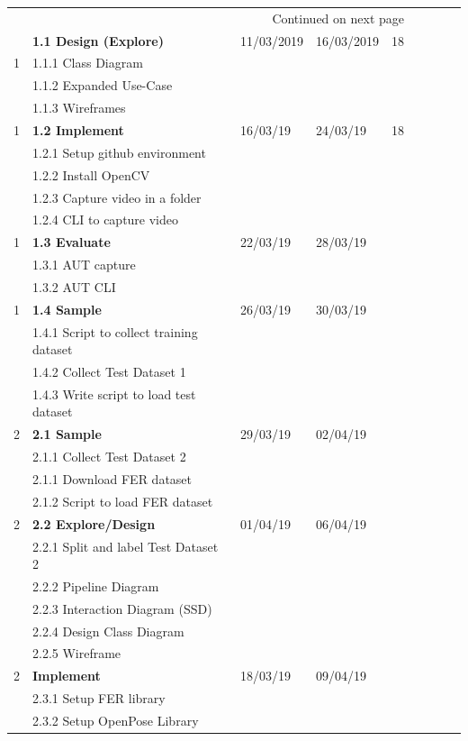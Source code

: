 \documentclass[12pt,a4paper,man]{report}
\begin{document}
\begin{longtable}{|l|l|l|l|l|l|l|lp{3cm}|}
\hline
\endhead
\hline\multicolumn{5}{r}{Continued on next page} \\
\endfoot
\endlastfoot
\hline
 & \textbf{1.1 Design (Explore)} & 11/03/2019 & 16/03/2019 & 18\\
1 & 1.1.1 Class Diagram &  &  & \\
 & 1.1.2 Expanded Use-Case &  &  & \\
 & 1.1.3 Wireframes &  &  & \\
\hline
1 & \textbf{1.2 Implement} & 16/03/19 & 24/03/19 & 18\\
 & 1.2.1 Setup github environment &  &  & \\
 & 1.2.2 Install OpenCV &  &  & \\
 & 1.2.3 Capture video in a folder &  &  & \\
 & 1.2.4 CLI to capture video &  &  & \\
\hline
1 & \textbf{1.3 Evaluate} & 22/03/19 & 28/03/19 & \\
 & 1.3.1 AUT capture &  &  & \\
 & 1.3.2 AUT CLI &  &  & \\
\hline
1 & \textbf{1.4 Sample} & 26/03/19 & 30/03/19 & \\
 & 1.4.1 Script to collect training dataset &  &  & \\
 & 1.4.2 Collect Test Dataset 1 &  &  & \\
 & 1.4.3 Write script to load test dataset &  &  & \\
\hline
2 & \textbf{2.1 Sample} & 29/03/19 & 02/04/19 & \\
 & 2.1.1 Collect Test Dataset 2 &  &  & \\
 & 2.1.1 Download FER dataset &  &  & \\
 & 2.1.2 Script to load FER dataset &  &  & \\
\hline
2 & \textbf{2.2 Explore/Design} & 01/04/19 & 06/04/19 & \\
 & 2.2.1 Split and label Test Dataset 2 &  &  & \\
 & 2.2.2 Pipeline Diagram &  &  & \\
 & 2.2.3 Interaction Diagram (SSD) &  &  & \\
 & 2.2.4 Design Class Diagram &  &  & \\
 & 2.2.5 Wireframe &  &  & \\
\hline
2 & \textbf{Implement} & 18/03/19 & 09/04/19 & \\
 & 2.3.1 Setup FER library &  &  & \\
 & 2.3.2 Setup OpenPose Library &  &  & \\

\end{longtable}
\end{document}
